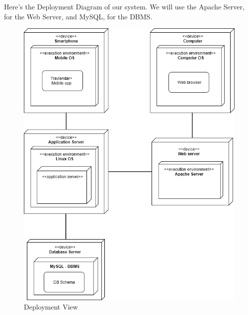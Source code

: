 Here's the Deployment Diagram of our system. We will use the Apache Server, for the Web Server, and MySQL, for the DBMS.
\begin{figure}[H]
	\centering
	\includegraphics[scale=0.3]{Images/Architecture/Deployment_View}
	\caption{Deployment View}
\end{figure}

